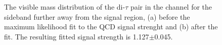 \begin{figure}[h!]
\begin{center}
\end{center}
\caption{The visible mass distribution of the di-$\tau$ pair in the \etau channel for the sideband further away from the signal region, (a) before
the maximum likelihood fit to the QCD signal strenght and (b) after the fit. The resulting fitted signal strength
is 1.127$\pm$0.045.}
\label{fig:mssm_qcdosss_etfar}
\end{figure}

